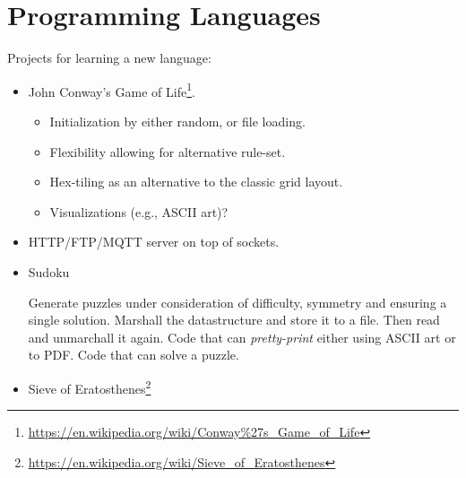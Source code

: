 \chapter{Programming Languages}

Projects for learning a new language:
\begin{itemize}
  \item John Conway's Game of Life\footnote{\url{https://en.wikipedia.org/wiki/Conway\%27s_Game_of_Life}}\cite{Gardener1970MathematicalGT}.
    \begin{itemize}
      \item Initialization by either random, or file loading.
      \item Flexibility allowing for alternative rule-set.
      \item Hex-tiling as an alternative to the classic grid layout.
      \item Visualizations (e.g., ASCII art)?
    \end{itemize}
  \item HTTP/FTP/MQTT server on top of sockets.
  \item Sudoku
    \begin{itemize}
       Generate puzzles under consideration of difficulty, symmetry and ensuring a single solution.
       Marshall the datastructure and store it to a file. Then read and unmarchall it again.
       Code that can \textsl{pretty-print} either using ASCII art or to PDF.
       Code that can solve a puzzle.
    \end{itemize}
  \item Sieve of Eratosthenes\footnote{\url{https://en.wikipedia.org/wiki/Sieve_of_Eratosthenes}}
\end{itemize}








